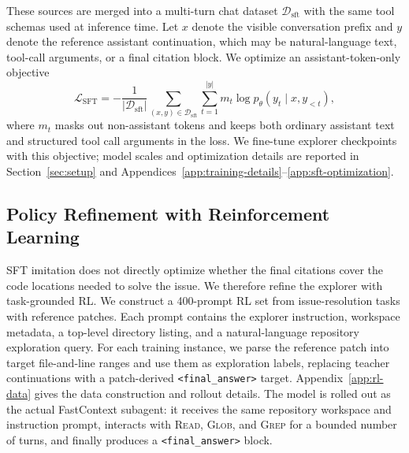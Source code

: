 \documentclass[11pt]{article}
\newcommand{\approach}{{FastContext}\xspace}
\begin{document}
These sources are merged into a multi-turn chat dataset $\mathcal{D}_{\mathrm{sft}}$ with the same tool schemas used at inference time.
Let $x$ denote the visible conversation prefix and $y$ denote the reference assistant continuation, which may be natural-language text, tool-call arguments, or a final citation block.
We optimize an assistant-token-only objective
\begin{equation}
\mathcal{L}_{\mathrm{SFT}}
= -\frac{1}{|\mathcal{D}_{\mathrm{sft}}|}
\sum_{(x,y) \in \mathcal{D}_{\mathrm{sft}}}
\sum_{t=1}^{|y|} m_t \log p_{\theta}(y_t \mid x, y_{<t}),
\end{equation}
where $m_t$ masks out non-assistant tokens and keeps both ordinary assistant text and structured tool call arguments in the loss.
We fine-tune explorer checkpoints with this objective; model scales and optimization details are reported in Section~\ref{sec:setup} and Appendices~\ref{app:training-details}--\ref{app:sft-optimization}.




\subsection{Policy Refinement with Reinforcement Learning}
\label{sec:rl}
SFT imitation does not directly optimize whether the final citations cover the code locations needed to solve the issue.
We therefore refine the explorer with task-grounded RL.
We construct a 400-prompt RL set from issue-resolution tasks with reference patches.
Each prompt contains the explorer instruction, workspace metadata, a top-level directory listing, and a natural-language repository exploration query.
For each training instance, we parse the reference patch into target file-and-line ranges and use them as exploration labels, replacing teacher continuations with a patch-derived \texttt{<final\_answer>} target.
Appendix~\ref{app:rl-data} gives the data construction and rollout details.
The model is rolled out as the actual \approach subagent: it receives the same repository workspace and instruction prompt, interacts with \textsc{Read}, \textsc{Glob}, and \textsc{Grep} for a bounded number of turns, and finally produces a \texttt{<final\_answer>} block.
\end{document}
